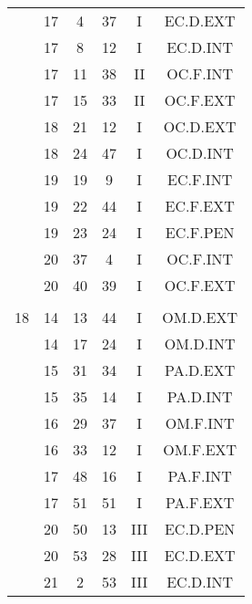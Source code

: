 \documentclass[12pt, a4paper]{article}
\begin{document}
\begin{multicols}{3}
{\begin{tabular}{c c c c c c}
	 	 	 	 & 17 & 4 & 37 & I & EC.D.EXT\\%
	 	 	 	 & 17 & 8 & 12 & I & EC.D.INT\\%
	 	 	 	 & 17 & 11 & 38 & II & OC.F.INT\\%
	 	 	 	 & 17 & 15 & 33 & II & OC.F.EXT\\%
	 	 	 	 & 18 & 21 & 12 & I & OC.D.EXT\\%
	 	 	 	 & 18 & 24 & 47 & I & OC.D.INT\\%
	 	 	 	 & 19 & 19 & 9 & I & EC.F.INT\\%
	 	 	 	 & 19 & 22 & 44 & I & EC.F.EXT\\%
	 	 	 	 & 19 & 23 & 24 & I & EC.F.PEN\\%
	 	 	 	 & 20 & 37 & 4 & I & OC.F.INT\\%
	 	 	 	 & 20 & 40 & 39 & I & OC.F.EXT\\%
	 	 	 	 & & & & & \\%
	 	 	 	18 & 14 & 13 & 44 & I & OM.D.EXT\\%
	 	 	 	 & 14 & 17 & 24 & I & OM.D.INT\\%
	 	 	 	 & 15 & 31 & 34 & I & PA.D.EXT\\%
	 	 	 	 & 15 & 35 & 14 & I & PA.D.INT\\%
	 	 	 	 & 16 & 29 & 37 & I & OM.F.INT\\%
	 	 	 	 & 16 & 33 & 12 & I & OM.F.EXT\\%
	 	 	 	 & 17 & 48 & 16 & I & PA.F.INT\\%
	 	 	 	 & 17 & 51 & 51 & I & PA.F.EXT\\%
	 	 	 	 & 20 & 50 & 13 & III & EC.D.PEN\\%
	 	 	 	 & 20 & 53 & 28 & III & EC.D.EXT\\%
	 	 	 	 & 21 & 2 & 53 & III & EC.D.INT\\%

\end{tabular}}
\end{multicols}
\end{document}

